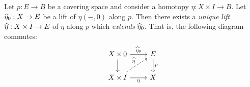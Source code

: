 \begin{proposition}
    \label{prop:homotopy-lift-via-covering-space}
    Let \(p: E \to B\) be a covering space and consider a homotopy \(\eta: X \times
    I \to B\). Let \(\widehat \eta_0: X \to E\) be a lift of \(\eta(-, 0)\) along
    \(p\). Then there exists a \emph{unique lift} \(\widehat \eta: X \times I \to E\)
    of \(\eta\) along \(p\) which \emph{extends} \(\widehat \eta_0\). That is, the
    following diagram commutes:
    \[
        \begin{tikzcd}
            X \times 0 \ar[r, "\lift \eta_0"] \ar[d]
            &E \ar[d, "p"] \\
            X \times I \ar[ru, dashed, "\lift \eta"] \ar[r, "\eta"']
            &X
        \end{tikzcd}
    \]
\end{proposition}

